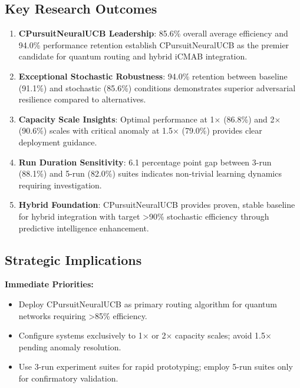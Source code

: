 \documentclass[12pt,a4paper]{article}
\newcommand{\performance}[1]{\textcolor{performancecolor}{\textbf{#1}}}
\newcommand{\critical}[1]{\textcolor{criticalcolor}{\textbf{#1}}}
\newcommand{\success}[1]{\textcolor{successcolor}{\textbf{#1}}}
\begin{document}
\subsection{Key Research Outcomes}

\begin{enumerate}
\item \performance{\textbf{CPursuitNeuralUCB Leadership}}: 85.6\% overall average efficiency and 94.0\% performance retention establish CPursuitNeuralUCB as the premier candidate for quantum routing and hybrid iCMAB integration.

\item \success{\textbf{Exceptional Stochastic Robustness}}: 94.0\% retention between baseline (91.1\%) and stochastic (85.6\%) conditions demonstrates superior adversarial resilience compared to alternatives.

\item \success{\textbf{Capacity Scale Insights}}: Optimal performance at 1$\times$ (86.8\%) and 2$\times$ (90.6\%) scales with critical anomaly at 1.5$\times$ (79.0\%) provides clear deployment guidance.

\item \critical{\textbf{Run Duration Sensitivity}}: 6.1 percentage point gap between 3-run (88.1\%) and 5-run (82.0\%) suites indicates non-trivial learning dynamics requiring investigation.

\item \success{\textbf{Hybrid Foundation}}: CPursuitNeuralUCB provides proven, stable baseline for hybrid integration with target >90\% stochastic efficiency through predictive intelligence enhancement.
\end{enumerate}

\subsection{Strategic Implications}

\textbf{Immediate Priorities:}
\begin{itemize}
\item Deploy CPursuitNeuralUCB as primary routing algorithm for quantum networks requiring >85\% efficiency.
\item Configure systems exclusively to 1$\times$ or 2$\times$ capacity scales; avoid 1.5$\times$ pending anomaly resolution.
\item Use 3-run experiment suites for rapid prototyping; employ 5-run suites only for confirmatory validation.
\end{itemize}
\end{document}
